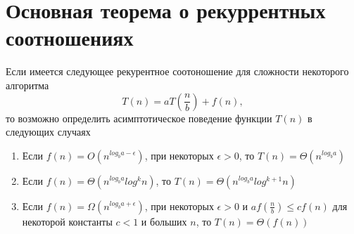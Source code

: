 \section{Основная теорема о рекуррентных соотношениях}

\begin{theorem}
\label{addAlgoMasterTheorem}
Если имеется следующее рекурентное соотоношение для сложности
некоторого алгоритма
\[
T\left( n \right ) = a T \left( \frac{n}{b} \right) + f\left( n \right ),
\]
то возможно определить асимптотическое поведение функции 
$T\left( n\right ) $ в следующих случаях
\begin{enumerate}
\item Если $f\left(n\right) = O\left( n^{log_ba - \epsilon}\right)$,
  при некоторых $\epsilon > 0$, то 
$T\left(n\right) = \Theta\left(n^{log_ba}\right)$
\item Если 
$f\left(n\right) = \Theta\left( n^{log_ba}log^{k}n\right)$, то 
$T\left(n\right) = \Theta\left(n^{log_ba}log^{k + 1}n\right)$
\item Если $f\left(n\right) = \Omega\left( n^{log_ba + \epsilon}\right)$,
  при некоторых $\epsilon > 0$ и $a f\left(\frac{n}{b}\right) \le c f
  \left( n \right)$ для некоторой константы $c < 1$ и больших $n$, то 
$T\left(n\right) = \Theta\left(f\left(n\right)\right)$
\end{enumerate}
\end{theorem}
